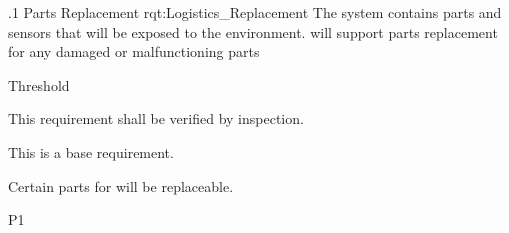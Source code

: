 \ONERQMTV
{\RqtNumberBase.1}
{Parts Replacement}
{rqt:Logistics_Replacement}
{The system contains parts and sensors that will be exposed to the environment. \ThisSystem will support parts replacement for any damaged or malfunctioning parts}
{
	\item [All Phases] Threshold
}
{This requirement shall be verified by inspection.}
{
	\item [N/A] This is a base requirement.
}
{
	\item Certain parts for \ThisSys will be replaceable.
}
{P1}

